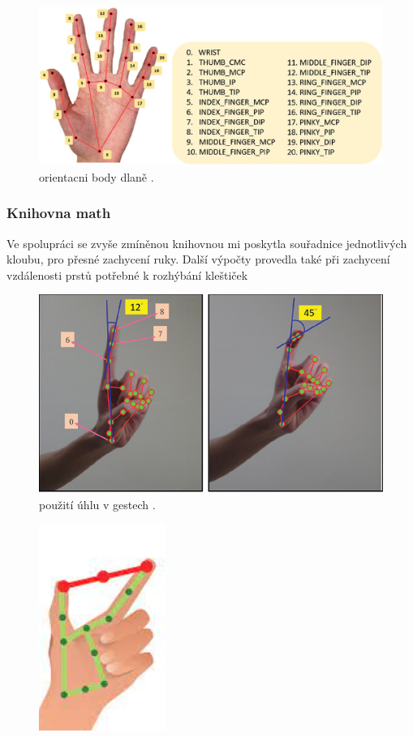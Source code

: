 \documentclass[12pt, a4paper,
twoside,        %
openright
]{report}
\begin{document}
{\begin{figure}[h]
	\centering
	\includegraphics[width=0.8\linewidth]{image/orientacniBody.jpg} 
	
	
	\caption{orientacni body dlaně \cite{orientacni body dlaně}.} %
	\label{fig:obvod} %
\end{figure}

\subsubsection{Knihovna math}

Ve spolupráci se zvyše zmíněnou knihovnou mi poskytla souřadnice jednotlivých kloubu, pro přesné zachycení ruky. 
Další výpočty provedla také při zachycení vzdálenosti prstů potřebné k rozhýbání kleštiček

\begin{figure}[h]
	
	\centering
	\includegraphics[width=0.4\linewidth]{image/prikladGesta.PNG} 
	
	
	\caption{použití úhlu v gestech \cite{uhly v gestech}.} %
	\label{fig:uhlyVGestech} %
\end{figure}
\begin{figure}[h]
	
	\centering
	\includegraphics[width=0.2\linewidth]{image/vzdalenost.PNG} 
	

\end{figure}}
\end{document}
